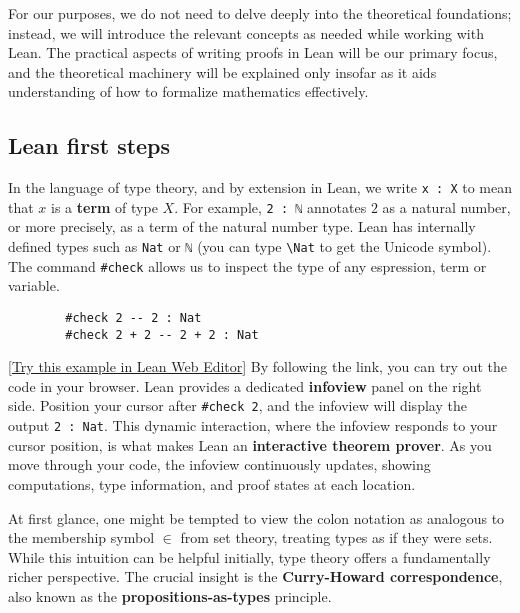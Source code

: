 For our purposes, we do not need to delve deeply into the theoretical foundations; 
instead, we will introduce the relevant concepts as needed while working with Lean. 
The practical aspects of writing proofs in Lean will be our primary focus, 
and the theoretical machinery will be explained only insofar as it aids understanding 
of how to formalize mathematics effectively.
\subsection{Lean first steps}

In the language of type theory, and by extension in Lean, we write \lstinline[language=lean]|x : X| 
to mean that $x$ is a \textbf{term} of type $X$. 
For example, \lstinline[language=lean]|2 : ℕ| annotates $2$ as a natural number, 
or more precisely, as a term of the natural number type. 
Lean has internally defined types such as \lstinline[language=lean]|Nat| or \lstinline[language=lean]|ℕ| 
(you can type \texttt{\textbackslash Nat} to get the Unicode symbol). 
The command \lstinline[language=lean]|#check| allows us to inspect the type of any espression, term or variable.
\begin{example}\mbox{}

    \begin{lstlisting}
        #check 2 -- 2 : Nat
        #check 2 + 2 -- 2 + 2 : Nat
    \end{lstlisting}
     [\href{https://live.lean-lang.org/#codez=MQYwFgpiDWAEBMAoUkYNgagUA}{Try this example in Lean Web Editor}]
By following the link, you can try out the code in your browser.
Lean provides a dedicated \textbf{infoview} panel on the right side. 
Position your cursor after \lstinline[language=lean]|#check 2|, 
and the infoview will display the output \lstinline[language=lean]|2 : Nat|. 
This dynamic interaction, where the infoview responds to your cursor position, is 
what makes Lean an \textbf{interactive theorem prover}. 
As you move through your code, the infoview continuously updates, 
showing computations, type information, and proof states at each location.
\end{example}
At first glance, one might be tempted to view the colon notation as analogous to the membership 
symbol $\in$ from set theory, treating types as if they were sets. 
While this intuition can be helpful initially, type theory offers a fundamentally richer perspective. 
The crucial insight is the \textbf{Curry-Howard correspondence}, 
also known as the \textbf{propositions-as-types} principle. 
